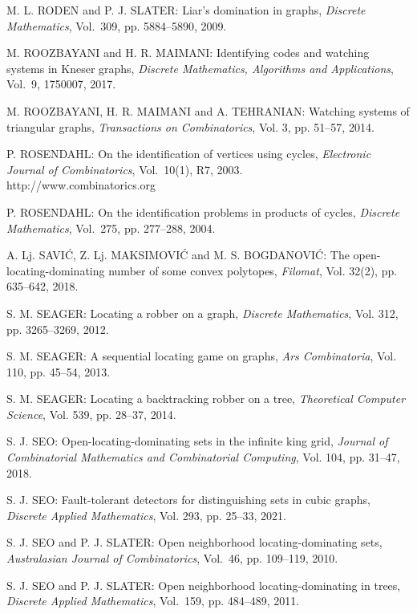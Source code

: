 \begin{thebibliography}{999}
M. L. RODEN and P. J. SLATER: Liar's domination in graphs, {\it Discrete Mathematics}, Vol.~309, pp. 5884--5890, 2009.

M. ROOZBAYANI and H. R. MAIMANI: Identifying codes and watching systems in Kneser graphs, {\it Discrete Mathematics, Algorithms and Applications}, Vol.~9, 1750007, 2017.

M. ROOZBAYANI, H. R. MAIMANI and A. TEHRANIAN: Watching systems of triangular graphs, {\it Transactions on Combinatorics}, Vol. 3, pp. 51--57, 2014.

P. ROSENDAHL: On the identification of vertices using cycles, {\it Electronic Journal of Combinatorics}, Vol.~10(1), R7, 2003.\\
http://www.combinatorics.org

P. ROSENDAHL: On the identification problems in products of cycles, {\it Discrete Mathematics}, Vol.~275, pp. 277--288, 2004.

A. Lj. SAVI\'C, Z. Lj. MAKSIMOVI\'C and M. S. BOGDANOVI\'C: The open-locating-dominating number of some convex polytopes, {\it Filomat}, Vol. 32(2), pp. 635--642, 2018.

S. M. SEAGER: Locating a robber on a graph, {\it Discrete Mathematics}, Vol. 312, pp. 3265--3269, 2012.

S. M. SEAGER: A sequential locating game on graphs, {\it Ars Combinatoria}, Vol. 110, pp. 45--54, 2013.

S. M. SEAGER: Locating a backtracking robber on a tree, {\it Theoretical Computer Science}, Vol. 539, pp. 28--37, 2014.

S. J. SEO: Open-locating-dominating sets in the infinite king grid, {\it Journal of Combinatorial Mathematics and Combinatorial Computing}, Vol. 104, pp. 31--47, 2018.

S. J. SEO: Fault-tolerant detectors for distinguishing sets in cubic graphs, {\it Discrete Applied Mathematics}, Vol. 293, pp. 25--33, 2021.

S. J. SEO and P. J. SLATER: Open neighborhood locating-dominating sets, {\it Australasian Journal of Combinatorics}, Vol.~46, pp. 109--119, 2010.

S. J. SEO and P. J. SLATER: Open neighborhood locating-dominating in trees, {\it Discrete Applied Mathematics}, Vol.~159, pp. 484--489, 2011.


\end{thebibliography}
